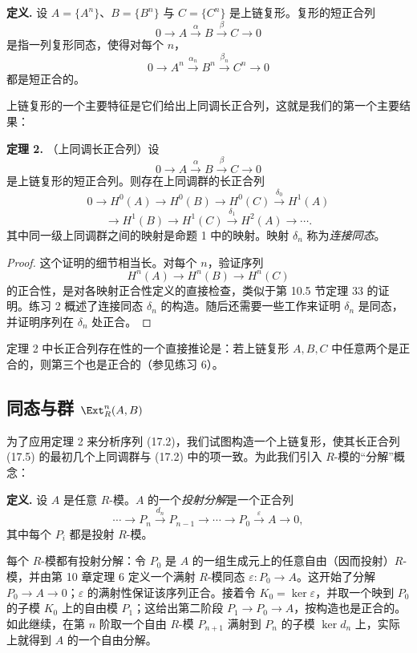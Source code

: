 \noindent\textbf{定义.} 设 $A=\{A^n\}$、$B=\{B^n\}$ 与 $C=\{C^n\}$ 是上链复形。复形的短正合列
\[
  0\to A\xrightarrow{\alpha}B\xrightarrow{\beta}C\to0
\]
是指一列复形同态，使得对每个 $n$，
\[
  0\to A^n\xrightarrow{\alpha_n}B^n\xrightarrow{\beta_n}C^n\to0
\]
都是短正合的。

上链复形的一个主要特征是它们给出上同调长正合列，这就是我们的第一个主要结果：

\medskip
\noindent\textbf{定理 2.} （上同调长正合列）设
\[
  0\to A\xrightarrow{\alpha}B\xrightarrow{\beta}C\to0
\]
是上链复形的短正合列。则存在上同调群的长正合列
\[
  0\to H^0(A)\to H^0(B)\to H^0(C)\xrightarrow{\delta_0}H^1(A)
\]
\[
  \to H^1(B)\to H^1(C)\xrightarrow{\delta_1}H^2(A)\to\cdots .
  \tag{17.5}
\]
其中同一级上同调群之间的映射是命题 1 中的映射。映射 $\delta_n$ 称为\emph{连接同态}。

\begin{proof}
这个证明的细节相当长。对每个 $n$，验证序列
\[
  H^n(A)\to H^n(B)\to H^n(C)
\]
的正合性，是对各映射正合性定义的直接检查，类似于第 10.5 节定理 33 的证明。练习 2 概述了连接同态 $\delta_n$ 的构造。随后还需要一些工作来证明 $\delta_n$ 是同态，并证明序列在 $\delta_n$ 处正合。
\end{proof}

定理 2 中长正合列存在性的一个直接推论是：若上链复形 $A,B,C$ 中任意两个是正合的，则第三个也是正合的（参见练习 6）。

\subsection*{同态与群 $\Ext_R^n(A,B)$}

为了应用定理 2 来分析序列 (17.2)，我们试图构造一个上链复形，使其长正合列 (17.5) 的最初几个上同调群与 (17.2) 中的项一致。为此我们引入 $R$-模的“分解”概念：

\noindent\textbf{定义.} 设 $A$ 是任意 $R$-模。$A$ 的一个\emph{投射分解}是一个正合列
\[
  \cdots\to P_n\xrightarrow{d_n}P_{n-1}\to\cdots\to P_0\xrightarrow{\varepsilon}A\to0,
  \tag{17.6}
\]
其中每个 $P_i$ 都是投射 $R$-模。

每个 $R$-模都有投射分解：令 $P_0$ 是 $A$ 的一组生成元上的任意自由（因而投射）$R$-模，并由第 10 章定理 6 定义一个满射 $R$-模同态 $\varepsilon:P_0\to A$。这开始了分解 $P_0\to A\to0$；$\varepsilon$ 的满射性保证该序列正合。接着令 $K_0=\ker\varepsilon$，并取一个映到 $P_0$ 的子模 $K_0$ 上的自由模 $P_1$；这给出第二阶段 $P_1\to P_0\to A$，按构造也是正合的。如此继续，在第 $n$ 阶取一个自由 $R$-模 $P_{n+1}$ 满射到 $P_n$ 的子模 $\ker d_n$ 上，实际上就得到 $A$ 的一个自由分解。

